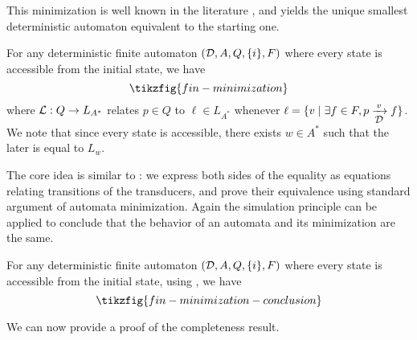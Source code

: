 This minimization is well known in the literature \cite{DBLP:books/daglib/0016921}, and yields the unique smallest deterministic automaton equivalent to the starting one.

\begin{proposition}\label{prop:minimization}
	For any deterministic finite automaton $({\mathcal{D}},A,Q,\{i\},F)$ where every state is accessible from the initial state, we have
	\[ \tikzfig{fin-minimization}\]
	where ${\mathcal{L}} : Q \to L_{A^*}$ relates $p \in Q$ to $\ell \in L_{A^*}$ whenever $\ell = \{ v \mid \exists f \in F, p \xrightarrow[\text{\small${\mathcal{D}}$}]{v} f\}$. We note that since every state is accessible, there exists $w \in A^*$ such that the later is equal to $L_w$.
\end{proposition}

The core idea is similar to : we express both sides of the equality as equations relating transitions of the transducers, and prove their equivalence using standard argument of automata minimization.
Again the simulation principle can be applied to conclude that the behavior of an automata and its minimization are the same.

\begin{corollary}\label{cor:minimization}
	For any deterministic finite automaton $({\mathcal{D}},A,Q,\{i\},F)$ where every state is accessible from the initial state, using , we have
	\[ \tikzfig{fin-minimization-conclusion}\]
\end{corollary}

We can now provide a proof of the completeness result.

